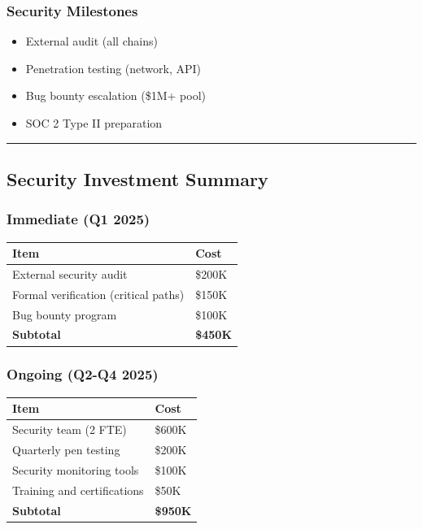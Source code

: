 \documentclass[
]{article}
\newcounter{none} %
\providecommand{\tightlist}{%
  \setlength{\itemsep}{0pt}\setlength{\parskip}{0pt}}
\begin{document}
\subsubsection{Security Milestones}\label{security-milestones}

\begin{itemize}
\tightlist
\item[$\square$]
  External audit (all chains)
\item[$\square$]
  Penetration testing (network, API)
\item[$\square$]
  Bug bounty escalation (\$1M+ pool)
\item[$\square$]
  SOC 2 Type II preparation
\end{itemize}

\begin{center}\rule{0.5\linewidth}{0.5pt}\end{center}

\subsection{Security Investment
Summary}\label{security-investment-summary}

\subsubsection{Immediate (Q1 2025)}\label{immediate-q1-2025}

{\def\LTcaptype{none} %
\begin{longtable}[]{@{}ll@{}}
\toprule\noalign{}
Item & Cost \\
\midrule\noalign{}
\endhead
\bottomrule\noalign{}
\endlastfoot
External security audit & \$200K \\
Formal verification (critical paths) & \$150K \\
Bug bounty program & \$100K \\
\textbf{Subtotal} & \textbf{\$450K} \\
\end{longtable}
}

\subsubsection{Ongoing (Q2-Q4 2025)}\label{ongoing-q2-q4-2025}

{\def\LTcaptype{none} %
\begin{longtable}[]{@{}ll@{}}
\toprule\noalign{}
Item & Cost \\
\midrule\noalign{}
\endhead
\bottomrule\noalign{}
\endlastfoot
Security team (2 FTE) & \$600K \\
Quarterly pen testing & \$200K \\
Security monitoring tools & \$100K \\
Training and certifications & \$50K \\
\textbf{Subtotal} & \textbf{\$950K} \\
\end{longtable}
}
\end{document}
